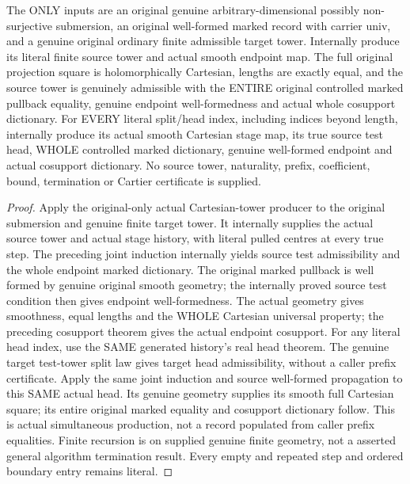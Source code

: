 \begin{theorem}
\label{hir:submersion-marked-cartesian-tower-original-production}
\leanok
{}
The ONLY inputs are an original genuine arbitrary-dimensional possibly
non-surjective submersion, an original well-formed marked record with
carrier univ, and a genuine original ordinary finite admissible target
tower. Internally produce its literal finite source tower and actual
smooth endpoint map. The full original projection square is holomorphically
Cartesian, lengths are exactly equal, and the source tower is genuinely
admissible with the ENTIRE original controlled marked pullback equality,
genuine endpoint well-formedness and actual whole cosupport dictionary.
For EVERY literal split/head index, including indices beyond length,
internally produce its actual smooth Cartesian stage map, its true source
test head, WHOLE controlled marked dictionary, genuine well-formed endpoint
and actual cosupport dictionary. No source tower, naturality, prefix,
coefficient, bound, termination or Cartier certificate is supplied.
\end{theorem}
\begin{proof}
Apply the original-only actual Cartesian-tower producer to the original
submersion and genuine finite target tower. It internally supplies the
actual source tower and actual stage history, with literal pulled centres
at every true step. The preceding joint induction internally yields source
test admissibility and the whole endpoint marked dictionary. The original
marked pullback is well formed by genuine original smooth geometry; the
internally proved source test condition then gives endpoint well-formedness.
The actual geometry gives smoothness, equal lengths and the WHOLE Cartesian
universal property; the preceding cosupport theorem gives the actual
endpoint cosupport. For any literal head index, use the SAME generated
history's real head theorem. The genuine target test-tower split law gives
target head admissibility, without a caller prefix certificate. Apply the
same joint induction and source well-formed propagation to this SAME
actual head. Its genuine geometry supplies its smooth full Cartesian
square; its entire original marked equality and cosupport dictionary follow.
This is actual simultaneous production, not a record populated from caller
prefix equalities. Finite recursion is on supplied genuine finite geometry,
not a asserted general algorithm termination result. Every empty and
repeated step and ordered boundary entry remains literal.
\end{proof}

